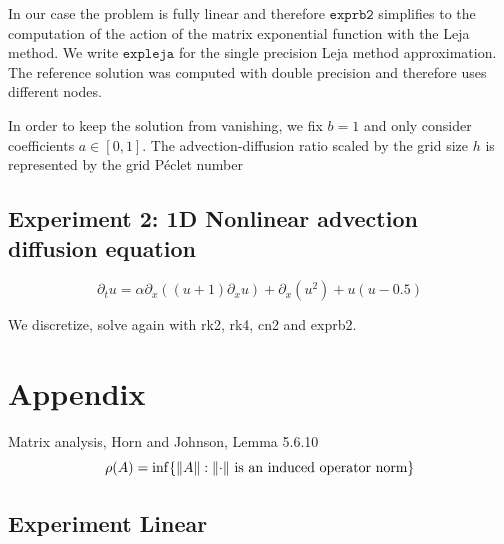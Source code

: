 \documentclass{scrartcl}
\begin{document}
	
	
	In our case the problem is fully linear and therefore $\texttt{exprb2}$ simplifies to the computation of the action of the matrix exponential function with the Leja method. We write $\texttt{expleja}$ for the single precision Leja method approximation. The reference solution was computed with double precision and therefore uses different nodes.
	
	In order to keep the solution from vanishing, we fix $b = 1$ and only consider coefficients $a\in[0,1]$. The advection-diffusion ratio scaled by the grid size $h$ is represented by the grid P\'eclet number
	
	
	\subsection{Experiment 2: 1D Nonlinear advection diffusion equation}
	\[ \partial_tu = \alpha\partial_{x}((u+1)\partial_{x}u) + \partial_{x}(u^2) + u(u-0.5) \]
	
	We discretize, solve again with rk2, rk4, cn2 and exprb2.
	
	\section{Appendix}
	Matrix analysis, Horn and Johnson, Lemma 5.6.10
	\[\rho(A) = \inf\{\lVert A\rVert : \lVert\cdot\rVert \text{ is an induced operator norm} \} \]
	
	
	\subsection{Experiment Linear}
	\newcommand{\Pe}{Pe=10.0}
	\newcommand{\precision}{single}
	\newcommand{\safe}{sf=1.1}
	
	
\end{document}
